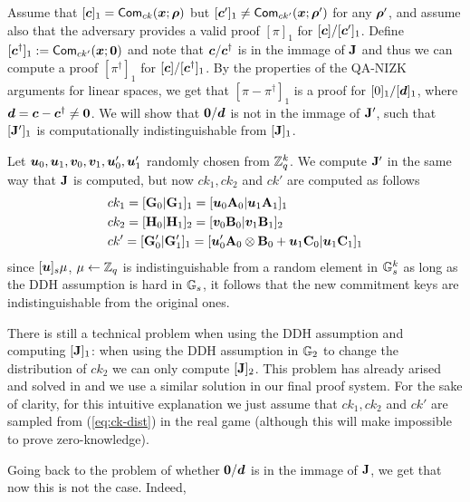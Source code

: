Assume that $[{\boldsymbol{c}}]_1 = \mathsf{Com}_{ck}({\boldsymbol{x}};{\boldsymbol{\rho}})$ but $[{\boldsymbol{c}}']_1\neq \mathsf{Com}_{ck'}({\boldsymbol{x}};{\boldsymbol{\rho}}')$ for any ${\boldsymbol{\rho}}'$, and assume also that the adversary provides a valid proof $[\pi]_1$ for $[{\boldsymbol{c}}]/[{\boldsymbol{c}}']_1$. Define $[{\boldsymbol{c}}^\dag]_1:=\mathsf{Com}_{ck'}({\boldsymbol{x}};{\boldsymbol{0}})$ and note that ${\boldsymbol{c}}/{\boldsymbol{c}}^\dag$ is in the immage of $\mathbf{{J}}$ and thus we can compute a proof $[\pi^\dag]_1$ for $[{\boldsymbol{c}}]/[{\boldsymbol{c}}^\dag]_1$. By the properties of the QA-NIZK arguments for linear spaces, we get that $[\pi-\pi^\dag]_1$ is a proof for $[0]_1/[{\boldsymbol{d}}]_1$, where ${\boldsymbol{d}}={\boldsymbol{c}}-{\boldsymbol{c}}^\dag\neq {\boldsymbol{0}}$. We will show that ${\boldsymbol{0}}/ {\boldsymbol{d}}$ is not in the immage of $\mathbf{{J}}'$, such that $[\mathbf{{J}}']_1$ is computationally indistinguishable from $[\mathbf{{J}}]_1$.

Let ${\boldsymbol{u}}_0,{\boldsymbol{u}}_1,{\boldsymbol{v}}_0,{\boldsymbol{v}}_1,{\boldsymbol{u}}'_0,{\boldsymbol{u}}'_1$ randomly chosen from $\mathbb{Z}_q^k$. We compute $\mathbf{{J}}'$ in the same way that $\mathbf{{J}}$ is computed, but now $ck_1,ck_2$ and $ck'$ are computed as follows
\begin{align}
&ck_1 = [\mathbf{{G}}_0|\mathbf{{G}}_1]_1 = [{\boldsymbol{u}}_0\mathbf{{A}}_{0}|{\boldsymbol{u}}_1\mathbf{{A}}_1]_1 \nonumber \\
&ck_2 = [\mathbf{{H}}_0|\mathbf{{H}}_1]_2 = [{\boldsymbol{v}}_0\mathbf{{B}}_{0}|{\boldsymbol{v}}_1\mathbf{{B}}_1]_2 \nonumber \\
&ck' =  [\mathbf{{G}}'_0|\mathbf{{G}}'_1]_1 = [{\boldsymbol{u}}'_0\mathbf{{A}}_0\otimes\mathbf{{B}}_0 + {\boldsymbol{u}}_1\mathbf{{C}}_0|{\boldsymbol{u}}_1\mathbf{{C}}_1]_1 \label{eq:ck-dist}
\end{align}
since $[{\boldsymbol{u}}]_s\mu$, $\mu\gets \mathbb{Z}_q$ is indistinguishable from a random element in $\mathbb{G}_s^k$ as long as the DDH assumption is hard in $\mathbb{G}_s$, it follows that the new commitment keys are indistinguishable from the original ones.

There is still a technical problem when using the DDH assumption and computing $[\mathbf{{J}}]_1$: when using the DDH assumption in $\mathbb{G}_2$ to change the distribution of $ck_2$ we can only compute $[\mathbf{{J}}]_2$. This problem has already arised and solved in \cite{AC:GonHevRaf15} and we use a similar solution in our final proof system. For the sake of clarity, for this intuitive explanation we just assume that $ck_1,ck_2$ and $ck'$ are sampled from (\ref{eq:ck-dist}) in the real game (although this will make impossible to prove zero-knowledge).

Going back to the problem of whether ${\boldsymbol{0}}/ {\boldsymbol{d}}$ is in the immage of $\mathbf{{J}}$, we get that now this is not the case. Indeed, 


